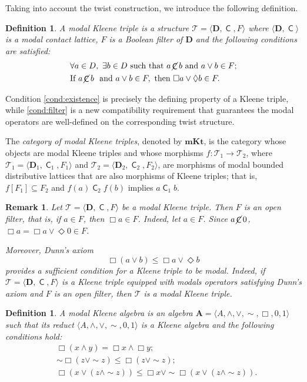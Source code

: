 \documentclass{article}
\newtheorem{remark}[theorem]{Remark}
\newtheorem{definition}[theorem]{Definition}
\DeclareMathOperator{\con}{\mathsf{C}}
\DeclareMathOperator{\notcon}{\cancel{ \con}}
\newcommand{\A}{\mathbf{A}}
\newcommand{\D}{\mathbf{D}}
\newcommand{\T}{\mathcal{T}}
\begin{document}
Taking into account the twist construction, we introduce the following definition.

\begin{definition}
\label{def:modal-triple}
A \emph{modal Kleene triple} is a structure $\T=\langle \D, \con, F\rangle$ where $\langle \D, \con \rangle$ is a modal contact lattice, $F$ is a Boolean filter of $\D$ and the following conditions are satisfied:
\begin{align}
    \label{cond:existence}
    &\forall a \in D,\ \exists b \in D \text{ such that } a\notcon b \text{ and } a \vee b \in F;\\
    \label{cond:filter}
    &\text{If } a\notcon b \ \text{ and } a \vee b \in F, \text{ then } \Box a \vee \Diamond b \in F.
\end{align}
\end{definition}

Condition \eqref{cond:existence} is precisely the defining property of a Kleene triple, while \eqref{cond:filter} is a new compatibility requirement that guarantees the modal operators are well-defined on the corresponding twist structure.

The \emph{category of modal Kleene triples}, denoted by $\mathbf{mKt}$, is the category whose objects are modal Kleene triples and whose morphisms $f:\T_1\to\T_2$, where $\T_1=\langle\D_1,\con_1,F_1\rangle$ and $\T_2=\langle\D_2,\con_2,F_2\rangle$, are morphisms of modal bounded distributive lattices that are also morphisms of Kleene triples; that is,
$f[F_1]\subseteq F_2$ and
$f(a) \con_2 f(b)$ implies $a\con_1 b$.

\begin{remark}\label{remark filter}
Let $\T=\langle \D,\con,F\rangle$ be a modal Kleene triple. Then $F$ is an open filter, that is, if $a\in F$, then $\Box a\in F$. Indeed, let $a\in F$. Since $a\notcon 0$, $\Box a=\Box a\vee\Diamond 0\in F$.

Moreover, Dunn's axiom
\[
\Box(a\vee b)\le \Box a\vee\Diamond b
\]
provides a sufficient condition for a Kleene triple to be modal. Indeed, if $\T=\langle \D,\con,F\rangle$ is a Kleene triple equipped with modals operators satisfying Dunn's axiom and $F$ is an open filter, then $\T$ is a modal Kleene triple.
\end{remark}

\begin{definition}
\label{def:modal-kleene}
A \emph{modal Kleene algebra} is an algebra $\A=\langle A,\wedge, \vee, \sim, \Box, 0,1\rangle$ such that its reduct $\langle A,\wedge, \vee, \sim, 0,1\rangle$ is a Kleene algebra and the following conditions hold:
    \begin{align}
        \label{mk}
        &\Box(x \wedge y) = \Box x \wedge \Box y;\tag{MK}\\
        \label{ax:Pos}
        &\sim\Box(z \vee \sim z)\leq \Box( z \vee \sim z);\tag{Pos}\\
        \label{ax:Con}
        &\Box(x \vee (z \wedge \sim z)) \leq \Box x\vee  \sim \Box(x \vee (z \wedge \sim z)).\tag{Con}
    \end{align}
\end{definition}
\end{document}

